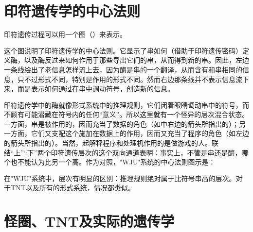 \section{印符遗传学的中心法则}

印符遗传过程可以用一个图（）来表示。

\begin{figure}
\begin{lrbox}{\TEMPBOX}
\end{lrbox}
\end{figure}

这个图说明了印符遗传学的中心法则。它显示了串如何（借助于印符遗传密码）定义酶，以及酶反过来如何作用于那些导出它们的串，从而得到新的串。因此，左边一条线绘出了老信息怎样流上去，因为酶是串的一个翻译，从而含有和串相同的信息，只不过形式不同，特别是作用的形式不同。然而右边那条线并不表示信息流下来，而是表示如何通过在串中调动符号，创造新的信息。

印符遗传学中的酶就像形式系统中的推理规则，它们闭着眼睛调动串中的符号，而不顾有可能潜藏在符号内的任何“意义”。所以这里就有一个怪异的层次混合状态。一方面，串是被作用的，因而充当了数据的角色（如中右边的箭头所指出的）；另一方面，它们又支配这个施加在数据上的作用，因而又充当了程序的角色（如左边的箭头所指出的）。当然，起解释程序和处理机作用的是做游戏的人。联结“上”“下”两个印符遗传层次的这个双向通道表明：事实上，不管是串还是酶，哪个也不能认为比另一个高。作为对照，"WJU"系统的中心法则图示是：
\begin{center}
\end{center}\nointerlineskip
在"WJU"系统中，层次有明显的区别：推理规则绝对属于比符号串高的层次。对于TNT以及所有的形式系统，情况都类似。

\section{怪圈、TNT及实际的遗传学}

